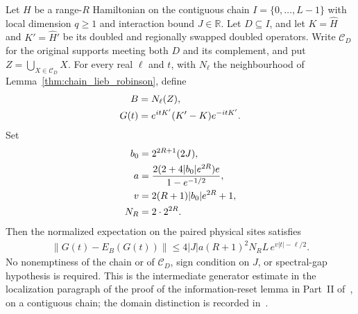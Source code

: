 \begin{lemma}
    \label{thm:chain_relative_generator_localization}
    \leanok
    Let $H$ be a range-$R$ Hamiltonian on the contiguous chain
    $I=\{0,\ldots,L-1\}$ with local dimension $q\ge1$ and interaction
    bound $J\in\mathbb R$. Let $D\subseteq I$, and let
    $K=\widehat H$ and $K'=\widehat H'$ be its doubled and regionally
    swapped doubled operators. Write $\mathcal C_D$ for the original
    supports meeting both $D$ and its complement, and put
    $Z=\bigcup_{X\in\mathcal C_D}X$.
    For every real $\ell$ and $t$, with $N_\ell$ the neighbourhood of
    Lemma~\ref{thm:chain_lieb_robinson}, define
    \begin{align}
        B    & =N_\ell(Z),\notag         \\
        G(t) & =e^{itK'}(K'-K)e^{-itK'}.
    \end{align}
    Set
    \begin{align}
        b_0 & =2^{2R+1}(2J),\notag                          \\
        a   & =\frac{2(2+4|b_0|e^{2R})e}{1-e^{-1/2}},\notag \\
        v   & =2(R+1)|b_0|e^{2R}+1,\notag                   \\
        N_R & =2\cdot2^{2R}.
    \end{align}
    Then the normalized expectation on the paired physical sites satisfies
    \begin{align}
        \|G(t)-E_B(G(t))\|
        \le4|J|a(R+1)^2N_R L\,e^{v|t|-\ell/2}.
    \end{align}
    No nonemptiness of the chain or of $\mathcal C_D$, sign condition on
    $J$, or spectral-gap hypothesis is required. This is the intermediate
    generator estimate in the localization paragraph of the proof of the
    information-reset lemma in Part~II of~\cite{TNLean2026OneDimensional},
    on a contiguous chain; the domain distinction is recorded
    in~\cite{gap:tnlean_one_dimensional_connected_domain_scope}.
\end{lemma}
